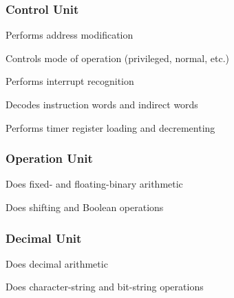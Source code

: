 \subsubsection{Control Unit}

\begin{description}

\item
Performs address modification

\item
Controls mode of operation (privileged, normal, etc.)

\item
Performs interrupt recognition

\item
Decodes instruction words and indirect words

\item
Performs timer register loading and decrementing

\end{description}

\subsubsection{Operation Unit}

\begin{description}

\item
Does fixed- and floating-binary arithmetic

\item
Does shifting and Boolean operations

\end{description}

\subsubsection{Decimal Unit}

\begin{description}

\item
Does decimal arithmetic

\item
Does character-string and bit-string operations

\end{description}

